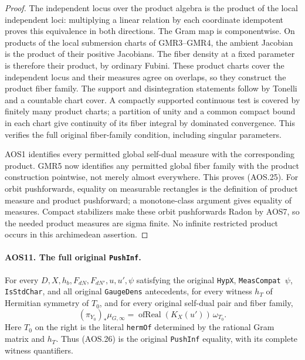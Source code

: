 \begin{proof}
The independent locus over the product algebra is the product of the
local independent loci: multiplying a linear relation by each
coordinate idempotent proves this equivalence in both directions.
The Gram map is componentwise.  On products
of the local submersion charts of GMR3--GMR4, the ambient Jacobian is
the product of their positive Jacobians.  The fiber density at a
fixed parameter is therefore their product, by ordinary Fubini.
These product charts cover the independent locus and their measures
agree on overlaps, so they construct the product fiber family.
The support and disintegration statements follow by Tonelli and a
countable chart cover.  A compactly supported continuous test is
covered by finitely many product charts; a partition of unity and
a common compact bound in each chart give continuity of its fiber
integral by dominated convergence.  This verifies the full original
fiber-family condition, including singular parameters.

AOS1 identifies every permitted global self-dual measure with the
corresponding product.  GMR5 now identifies any permitted global
fiber family with the product construction pointwise, not merely
almost everywhere.  This proves (AOS.25).  For orbit pushforwards,
equality on measurable rectangles is the definition of product
measure and product pushforward; a monotone-class argument gives
equality of measures.  Compact stabilizers make these orbit
pushforwards Radon by AOS7, so the needed product measures are
sigma finite.  No infinite restricted product occurs in this
archimedean assertion.
\end{proof}

\paragraph{AOS11. The full original \texttt{PushInf}.}
\label{claim:AOS11}
For every $D,X,h_b,F_{dN},F_{dN'},u,u',\psi$ satisfying the original
\texttt{HypX}, \texttt{MeasCompat\,$\psi$}, \texttt{IsStdChar}, and
all original \texttt{GaugeDens} antecedents, for every witness
$h_T$ of Hermitian symmetry of $T_0$, and for every original
self-dual pair and fiber family,
\[
             (\pi_{Y_0})_*\mu_{G,\infty}
                  =\operatorname{ofReal}(K_X(u'))\,\omega_{T_0}.
 \tag{AOS.26}
\]
Here $T_0$ on the right is the literal \texttt{hermOf} determined by
the rational Gram matrix and $h_T$.  Thus (AOS.26) is the original
\texttt{PushInf} equality, with its complete witness quantifiers.

